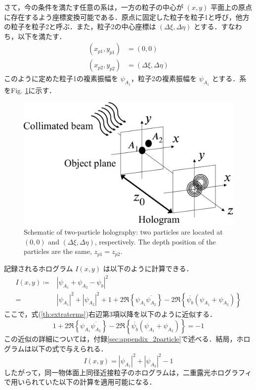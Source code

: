 さて，今の条件を満たす任意の系は，一方の粒子の中心が $(x,y)$ 平面上の原点に存在するよう座標変換可能である．原点に固定した粒子を粒子1と呼び，他方の粒子を粒子2と呼ぶ．また，粒子2の中心座標は $(\Delta \xi, \Delta \eta)$ とする．すなわち，以下を満たす．
\begin{align}
    \left( x_{p1}, y_{p1} \right) &= (0,0) \\
    \left( x_{p2}, y_{p2} \right) &= (\Delta \xi ,\Delta \eta)
\end{align}
このように定めた粒子1の複素振幅を $\psi_{A_1}$，粒子2の複素振幅を $\psi_{A_1}$ とする．系をFig. \ref{fig:twoParticleHolography}に示す．

\begin{figure}[htbp]
    \centering
    \includegraphics[width=0.8\linewidth]{./Figure/2_Theory/two_particle.pdf}
    \caption{Schematic of two-particle holography: two particles are located at $(0,0)$ and $(\Delta \xi, \Delta \eta)$, respectively. The depth position of the particles are the same, $z_{p1} = z_{p2}$.}
    \label{fig:twoParticleHolography}
\end{figure}

記録されるホログラム $I(x,y)$ は以下のように計算できる．
\begin{align}
    I(x,y) \coloneqq& \left|\psi_{A_1} + \psi_{A_2} - \psi_b \right|^2 \\
    \label{th:extraterms}
    =& |\psi_{A_1}|^2 + |\psi_{A_2}|^2 + 1 + 2\Re \left\{ \psi_{A_1} \overline{\psi_{A_2}} \right\} - 2\Re \left\{\overline{\psi_b}\left( \psi_{A_1} + \psi_{A_2} \right)\right\}
\end{align}
ここで，式(\ref{th:extraterms})右辺第3項以降を以下のように近似する．
\begin{equation}
    1 + 2\Re \left\{ \psi_{A_1} \overline{\psi_{A_2}} \right\} - 2\Re \left\{\overline{\psi_b}\left( \psi_{A_1} + \psi_{A_2} \right)\right\} = -1
\end{equation}
この近似の詳細については，付録\ref{sec:appendix_2particle}で述べる．結局，ホログラムは以下の式で与えられる．
\begin{equation}
    \label{th:2particleHologram}
    I(x,y) = |\psi_{A_1}|^2 + |\psi_{A_2}|^2 - 1
\end{equation}
したがって，同一物体面上同径近接粒子のホログラムは，二重露光ホログラフィで用いられていた以下の計算を適用可能になる\cite{doubleexposure}．

